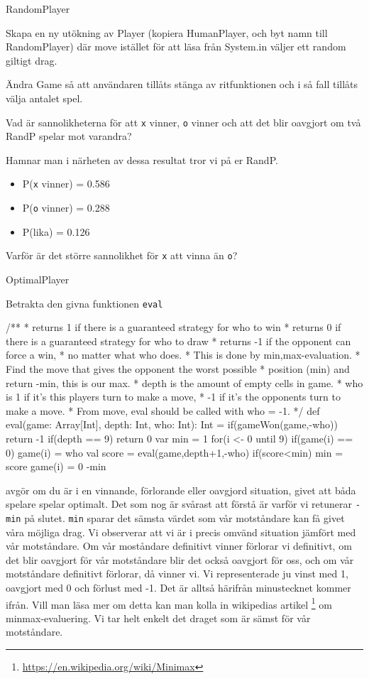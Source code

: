 \Task RandomPlayer

\Subtask Skapa en ny utökning av Player (kopiera HumanPlayer, och byt namn till RandomPlayer) där move istället för att läsa från System.in väljer ett random giltigt drag.

\Subtask Ändra Game så att användaren tillåts stänga av ritfunktionen och i så fall tillåts välja antalet spel.

\Subtask Vad är sannolikheterna för att \texttt{x} vinner, \texttt{o} vinner och att det blir oavgjort om två RandP spelar mot varandra?

Hamnar man i närheten av dessa resultat tror vi på er RandP.
\begin{itemize}
	\item P(\texttt{x} vinner) = 0.586
	\item P(\texttt{o} vinner) = 0.288
	\item P(lika) = 0.126
\end{itemize}

\Subtask Varför är det större sannolikhet för \texttt{x} att vinna än \texttt{o}?

\Task OptimalPlayer

Betrakta den givna funktionen \texttt{eval}
\begin{Code}
/**
 * returns 1 if there is a guaranteed strategy for who to win 
 * returns 0 if there is a guaranteed strategy for who to draw 
 * returns -1 if the opponent can force a win,
 * no matter what who does.
 * This is done by min,max-evaluation. 
 * Find the move that gives the opponent the worst possible
 * position (min) and return -min, this is our max.
 * depth is the amount of empty cells in game.
 * who is 1 if it's this players turn to make a move,
 * -1 if it's the opponents turn to make a move. 
 * From move, eval should be called with who = -1.
 */
def eval(game: Array[Int], depth: Int, who: Int): Int = {
	if(gameWon(game,-who)) return -1
	if(depth == 9) return 0
	var min = 1
	for(i <- 0 until 9) {
		if(game(i) == 0) {
			game(i) = who
			val score = eval(game,depth+1,-who)
			if(score<min){
				min = score
			}
			game(i) = 0
		}
	}
	-min
}
\end{Code}

 avgör om du är i en vinnande, förlorande eller oavgjord situation, givet att båda spelare spelar optimalt. Det som nog är svårast att förstå är varför vi retunerar \texttt{-min} på slutet. \texttt{min} sparar det sämsta värdet som vår motståndare kan få givet våra möjliga drag. Vi observerar att vi är i precis omvänd situation jämfört med vår motståndare. Om vår moståndare definitivt vinner förlorar vi definitivt, om det blir oavgjort för vår motståndare blir det också oavgjort för oss, och om vår motståndare definitivt förlorar, då vinner vi. Vi representerade ju vinst med 1, oavgjort med 0 och förlust med -1. Det är alltså härifrån minustecknet kommer ifrån. Vill man läsa mer om detta kan man kolla in wikipedias artikel \footnote{\url{https://en.wikipedia.org/wiki/Minimax}} om minmax-evaluering. Vi tar helt enkelt det draget som är sämst för vår motståndare.

